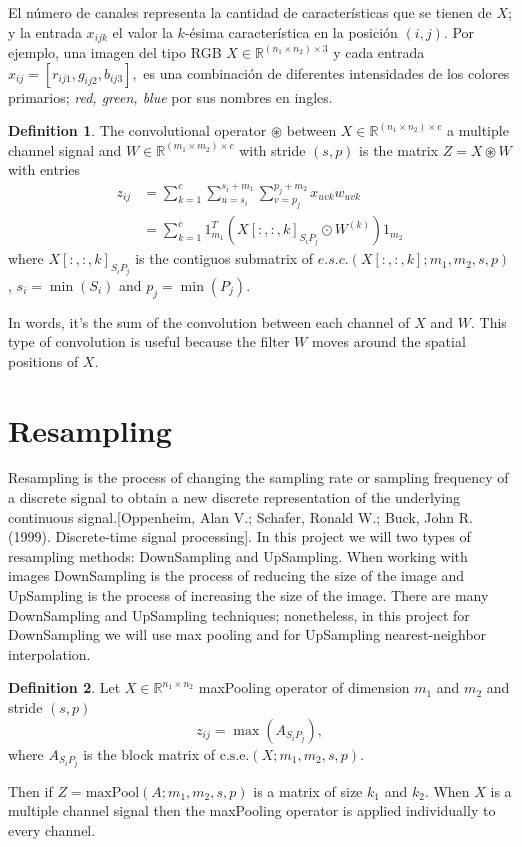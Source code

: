 \documentclass{article}
\theoremstyle{definition}
\newtheorem{definition}{Definition}
\begin{document}
\noindent
El número de canales representa la cantidad de características que se tienen de $X$; y la entrada $x_{ijk}$
el valor la $k$-ésima característica en la posición $(i,j)$. Por ejemplo, una imagen del tipo RGB $X\in\mathbb{R}^{(n_1\times n_2)\times 3}$ y cada entrada $x_{ij}=[r_{ij1},g_{ij2},b_{ij3}],$ es una combinación de diferentes intensidades de los colores primarios; \textit{red, green, blue} por sus nombres en ingles.

\begin{definition}
The convolutional operator $\circledast$  between $X\in\mathbb{R}^{(n_1\times n_2)\times c}$ a multiple channel signal and $W\in\mathbb{R}^{(m_1\times m_2)\times c}$ with stride $(s,p)$ is the matrix $Z=X\circledast W$ with entries 
\begin{equation*}
\begin{split}
z_{ij} &=\sum_{k=1}^{c}\sum_{u=s_i}^{s_i+m_1}\sum_{v=p_j}^{p_j+m_2}x_{uvk}w_{uvk}\\
&=\sum_{k=1}^{c} 1_{m_1}^T(X[:,:,k]_{S_i P_j}\odot W^{(k)})1_{m_2}
\end{split}
\end{equation*}
where $X[:,:,k]_{S_i P_j}$ is the contiguos submatrix of  $e.s.c.(X[:,:,k];m_1,m_2,s,p)$, $s_i=\min(S_i)$ and $p_j=\min(P_j)$. 
\end{definition}
\noindent
In words, it's the sum of the convolution between each channel of $X$ and $W$. This type of convolution is useful because the filter $W$ moves around the spatial positions of $X$.

\section{Resampling}
Resampling is the process of changing the sampling rate or sampling frequency of a discrete signal to obtain a new discrete representation of the underlying continuous signal.[Oppenheim, Alan V.; Schafer, Ronald W.; Buck, John R. (1999). Discrete-time signal processing]. In this project we will two types of resampling methods: DownSampling and UpSampling. When working with images DownSampling is the process of reducing the size of the image and UpSampling is the process of increasing the size of the image. There are many DownSampling and UpSampling techniques; nonetheless, in this project for DownSampling we will use max pooling and for UpSampling nearest-neighbor interpolation.

\begin{definition}
Let $X\in\mathbb{R}^{n_1\times n_2}$  maxPooling operator of dimension $m_1$ and $m_2$ and stride $(s,p)$
\begin{equation}
z_{ij}=\max(A_{S_iP_j}),
\end{equation}
where $A_{S_iP_j}$ is the block matrix of $\mbox{c.s.e.}(X;m_1,m_2,s,p)$.
\end{definition}
Then if $Z = \mbox{maxPool}(A;m_1,m_2,s,p)$  is a matrix of size $k_1$ and $k_2$. When $X$ is a multiple channel signal then the maxPooling operator is applied individually to every channel.
\end{document}

